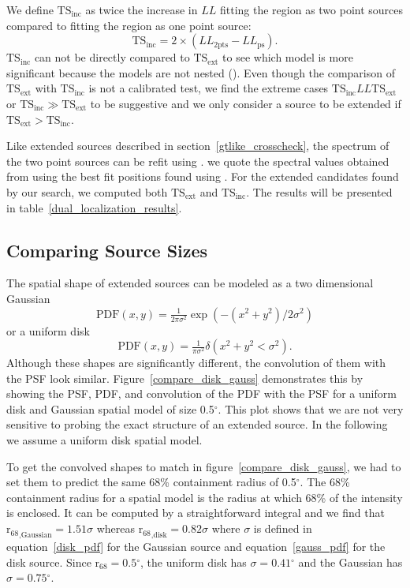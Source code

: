 \documentclass[12pt,preprint]{aastex}
\newcommand{\tsext}{{\ensuremath{\text{TS}_\text{ext}}}\xspace}
\newcommand{\tsinc}{\ensuremath{\text{TS}_\text{inc}}\xspace}
\newcommand{\loglikelihood}{\ensuremath{LL}\xspace}
\newcommand{\rsixeight}{{\ensuremath{\text{r}_{68}}}\xspace}
\renewcommand{\deg}{\ensuremath{^\circ}\xspace}
\newcommand{\pointlike}{\text{\em pointlike}\xspace}
\newcommand{\gtlike}{\text{\em gtlike}\xspace}
\begin{document}
We define \tsinc as twice the increase in \loglikelihood fitting the
region as two point sources compared to fitting the region as one point
source: \begin{equation}
  \tsinc=2\times(\loglikelihood_\text{2pts}-\loglikelihood_\text{ps}).
\end{equation} \tsinc can not be directly compared to \tsext to see
which model is more significant because the models are not nested
(\cite{statistics_with_care}). Even though the comparison of \tsext
with \tsinc is not a calibrated test, we find the extreme cases $\tsinc
\loglikelihood \tsext$ or $\tsinc\gg\tsext$ to be suggestive and we only
consider a source to be extended if $\tsext>\tsinc$.

Like extended sources described in section~\ref{gtlike_crosscheck},
the spectrum of the two point sources can be refit using \gtlike.
we quote the spectral values obtained from \gtlike using the best fit
positions found using \pointlike.  For the extended candidates found
by our search, we computed both \tsext and \tsinc.  The results will be
presented in table~\ref{dual_localization_results}.

\subsection{Comparing Source Sizes}

\label{compare_source_size}

The spatial shape of extended sources can be modeled
as a two dimensional Gaussian
\begin{equation}\label{gauss_pdf}
  \text{PDF}(x,y)=\tfrac{1}{2\pi\sigma^2}\exp\left(-(x^2+y^2)/2\sigma^2\right)
\end{equation}
or a uniform disk
\begin{equation}\label{disk_pdf}
  \text{PDF}(x,y)=\tfrac{1}{\pi\sigma^2}\delta\left(x^2+y^2<\sigma^2\right).
\end{equation}
Although these shapes are significantly different, the convolution of them
with the PSF look similar.  Figure~\ref{compare_disk_gauss} demonstrates
this by showing the PSF, PDF, and convolution of the PDF with the PSF
for a uniform disk and Gaussian spatial model of size 0.5\deg.  This plot
shows that we are not very sensitive to probing the exact structure of an
extended source.  In the following we assume a uniform disk spatial model.

To get the convolved shapes to match in figure~\ref{compare_disk_gauss},
we had to set them to predict the same 68\% containment
radius of 0.5\deg.  The 68\% containment radius for a
spatial model is the radius at which 68\% of the intensity is
enclosed.  It can be computed by a straightforward integral
and we find that $\rsixeight_\text{,Gaussian}=1.51\sigma$
whereas $\rsixeight_\text{,disk}=0.82\sigma$ where $\sigma$
is defined in equation~\ref{disk_pdf} for the Gaussian source and
equation~\ref{gauss_pdf} for the disk source.  Since $\rsixeight=0.5\deg$,
the uniform disk has $\sigma=0.41\deg$ and the Gaussian has
$\sigma=0.75\deg$.
\end{document}
